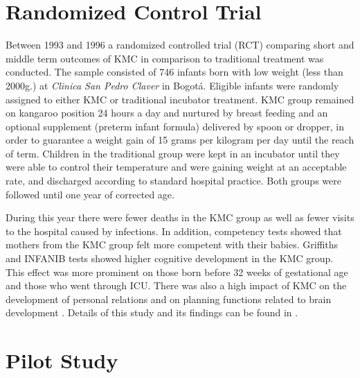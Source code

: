 \section{Randomized Control Trial}

Between 1993 and 1996 a randomized controlled trial (RCT) comparing short and middle term outcomes of KMC in comparison to traditional treatment was conducted. The sample consisted of 746 infants born with low weight (less than 2000g.) at \emph{Clinica San Pedro Claver} in Bogotá. Eligible infants were randomly assigned to either KMC or traditional incubator treatment. KMC group remained on kangaroo position 24 hours a day and nurtured by breast feeding and an optional supplement (preterm infant formula) delivered by spoon or dropper, in order to guarantee a weight gain of 15 grams per kilogram per day until the reach of term. Children in the traditional group were kept in an incubator until they were able to control their temperature and were gaining weight at an acceptable rate, and discharged according to standard hospital practice. Both groups were followed until one year of corrected age. 

During this year there were fewer deaths in the KMC group as well as fewer visits to the hospital caused by infections. In addition, competency tests showed that mothers from the KMC group felt more competent with their babies. Griffiths and INFANIB tests showed higher cognitive development in the KMC group. This effect was more prominent on those born before 32 weeks of gestational age and those who went through ICU. There was also a high impact of KMC on the development of personal relations and on planning functions related to brain development \autocite{tessier_kangaroo_2003}. Details of this study and its findings can be found in \autocite{charpak_current_1996,charpak_kangaroo_1997,charpak_randomized_2001,charpak_kangaroo_2005}.



\section{Pilot Study}


